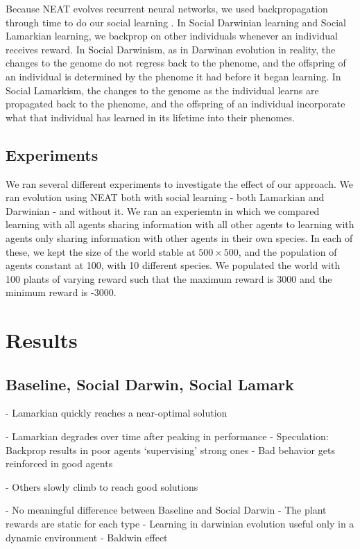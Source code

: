 \documentclass{acm_proc_article-sp}
\begin{document}
Because NEAT evolves recurrent neural networks, we used backpropagation through time to do our social learning \cite{somedude}.
In Social Darwinian learning and Social Lamarkian learning, we backprop on other individuals whenever an individual receives reward.
In Social Darwinism, as in Darwinan evolution in reality, the changes to the genome do not regress back to the phenome, and the offspring of an individual is determined by the phenome it had before it began learning.
In Social Lamarkism, the changes to the genome as the individual learns are propagated back to the phenome, and the offspring of an individual incorporate what that individual has learned in its lifetime into their phenomes.
\subsection*{Experiments} 
We ran several different experiments to investigate the effect of our approach.
We ran evolution using NEAT both with social learning - both Lamarkian and Darwinian - and without it.
We ran an experiemtn in which we compared learning with all agents sharing information with all other agents to learning with agents only sharing information with other agents in their own species.
In each of these, we kept the size of the world stable at $500\times500$, and the population of agents constant at 100, with 10 different species. 
 We populated the world with 100 plants of varying reward such that the maximum reward is 3000 and the minimum reward is -3000.

\section{Results}
\label{sec:results}
\subsection*{ Baseline, Social Darwin, Social Lamark}
        - Lamarkian quickly reaches a near-optimal solution
        
        - Lamarkian degrades over time after peaking in performance
            - Speculation: Backprop results in poor agents ‘supervising’ strong ones
            - Bad behavior gets reinforced in good agents
            
        - Others slowly climb to reach good solutions
        
        - No meaningful difference between Baseline and Social Darwin
            - The plant rewards are static for each type
            - Learning in darwinian evolution useful only in a dynamic environment
            - Baldwin effect
\end{document}
